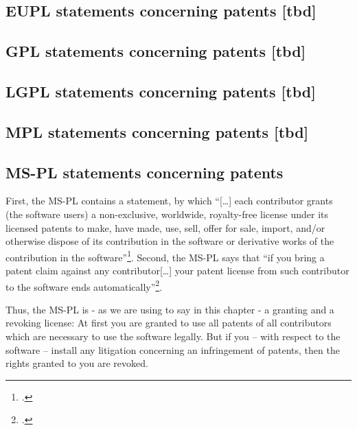\subsection{EUPL statements concerning patents [tbd]}

\subsection{GPL statements concerning patents [tbd]}

\subsection{LGPL statements concerning patents [tbd]}
 
\subsection{MPL statements concerning patents [tbd]}         

\subsection{MS-PL statements concerning patents}\label{subsec:MsplPatentClause}

First, the MS-PL contains a statement, by which \enquote{[\ldots] each
contributor grants (the software users) a non-exclusive, worldwide, royalty-free
license under its licensed patents to make, have made, use, sell, offer for
sale, import, and/or otherwise dispose of its contribution in the software or
derivative works of the contribution in the software}\footcite[cf.][\nopage wp.
§2.B]{MsplOsiLicense2013a}. Second, the MS-PL says that \enquote{if you bring a
patent claim against any contributor[\ldots] your patent license from such
contributor to the software ends automatically}\footcite[cf.][\nopage wp.
§3.B]{MsplOsiLicense2013a}.

Thus, the MS-PL is - as we are using to say in this chapter - a granting and a
revoking license: At first you are granted to use all patents of all
contributors which are necessary to use the software legally. But if you -- with
respect to the software -- install any litigation concerning an infringement of
patents, then the rights granted to you are revoked.




% 
